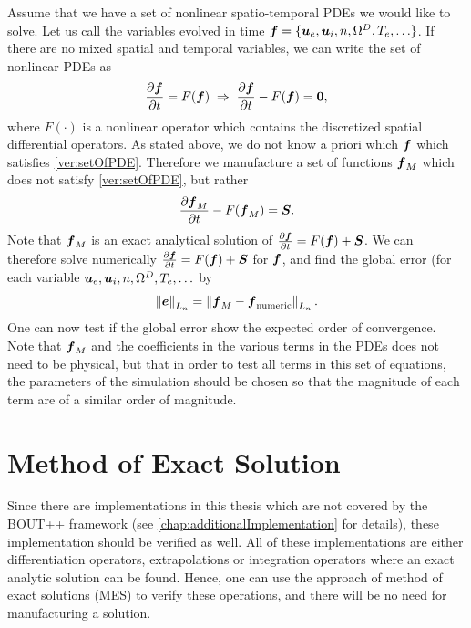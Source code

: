 Assume that we have a set of nonlinear spatio-temporal PDEs we would like to solve.
Let us call the variables evolved in time $\boldsymbol{f}=\{\boldsymbol{u}_e, \boldsymbol{u}_i, n, \Omega^D, T_e, \ldots\}$.
If there are no mixed spatial and temporal variables, we can write the set of nonlinear PDEs as
%
\begin{align}
    \frac{\partial {\boldsymbol{f}}}{\partial{t}} = F(\boldsymbol{f}) \; \Rightarrow \; \frac{\partial {\boldsymbol{f}}}{\partial{t}} - F(\boldsymbol{f}) = \boldsymbol{0},
  \label{ver:setOfPDE}
\end{align}
%
where $F(\cdot)$ is a nonlinear operator which contains the discretized spatial differential operators.
As stated above, we do not know a priori which $\boldsymbol{f}$ which satisfies \cref{ver:setOfPDE}.
Therefore we manufacture a set of functions $\boldsymbol{f}_M$ which does not satisfy \cref{ver:setOfPDE}, but rather
%
\begin{align*}
    \frac{\partial {\boldsymbol{f}_M}}{\partial{t}} - F(\boldsymbol{f}_M) = \boldsymbol{S}.
\end{align*}
%
Note that $\boldsymbol{f}_M$ is an exact analytical solution of $\frac{\partial {\boldsymbol{f}}}{\partial{t}} = F(\boldsymbol{f}) + \boldsymbol{S}$.
We can therefore solve numerically $\frac{\partial {\boldsymbol{f}}}{\partial{t}} = F(\boldsymbol{f}) + \boldsymbol{S}$ for $\boldsymbol{f}$, and find the global error (for each variable $\boldsymbol{u}_e, \boldsymbol{u}_i, n, \Omega^D, T_e, \ldots$ by
%
\begin{align*}
    \left\|\boldsymbol{e}\right\|_{L_n} =
    \left\|\boldsymbol{f}_{M} - \boldsymbol{f}_{\text{numeric}}\right\|_{L_n}.
\end{align*}
%
One can now test if the global error show the expected order of convergence.
Note that $\boldsymbol{f}_M$ and the coefficients in the various terms in the PDEs does not need to be physical, but that in order to test all terms in this set of equations, the parameters of the simulation should be chosen so that the magnitude of each term are of a similar order of magnitude.

\section{Method of Exact Solution}
\label{sec:MES}
%
Since there are implementations in this thesis which are not covered by the BOUT++ framework (see \cref{chap:additionalImplementation} for details), these implementation should be verified as well.
All of these implementations are either differentiation operators, extrapolations or integration operators where an exact analytic solution can be found.
Hence, one can use the approach of method of exact solutions (MES) to verify these operations, and there will be no need for manufacturing a solution.

